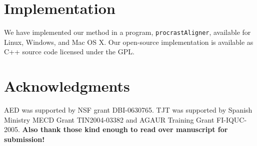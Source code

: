 \documentclass{ws-procs975x65}
\begin{document}
\section{Implementation}
We have implemented our method in a program, \texttt{procrastAligner}, available for Linux, Windows, and Mac OS X. Our open-source implementation is available as C++ source code licensed under the GPL.

\section{ Acknowledgments }
AED was supported by NSF grant DBI-0630765. TJT was
supported by Spanish Ministry MECD Grant TIN2004-03382 and AGAUR
Training Grant FI-IQUC-2005. \textbf{Also thank those kind enough to read over manuscript for submission!}




\end{document}
